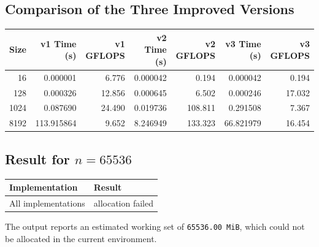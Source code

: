 \documentclass[11pt,a4paper]{article}
\begin{document}
\subsection{Comparison of the Three Improved Versions}
\begin{center}
\begin{tabular}{rrrrrrr}
\toprule
Size & v1 Time (s) & v1 GFLOPS & v2 Time (s) & v2 GFLOPS & v3 Time (s) & v3 GFLOPS \\
\midrule
16   & 0.000001   & 6.776   & 0.000042   & 0.194    & 0.000042   & 0.194 \\
128  & 0.000326   & 12.856  & 0.000645   & 6.502    & 0.000246   & 17.032 \\
1024 & 0.087690   & 24.490  & 0.019736   & 108.811  & 0.291508   & 7.367 \\
8192 & 113.915864 & 9.652   & 8.246949   & 133.323  & 66.821979  & 16.454 \\
\bottomrule
\end{tabular}
\end{center}

\subsection{Result for \(n = 65536\)}
\begin{center}
\begin{tabular}{ll}
\toprule
Implementation & Result \\
\midrule
All implementations & allocation failed \\
\bottomrule
\end{tabular}
\end{center}

The output reports an estimated working set of \texttt{65536.00 MiB}, which could not be allocated in the current environment.
\end{document}
